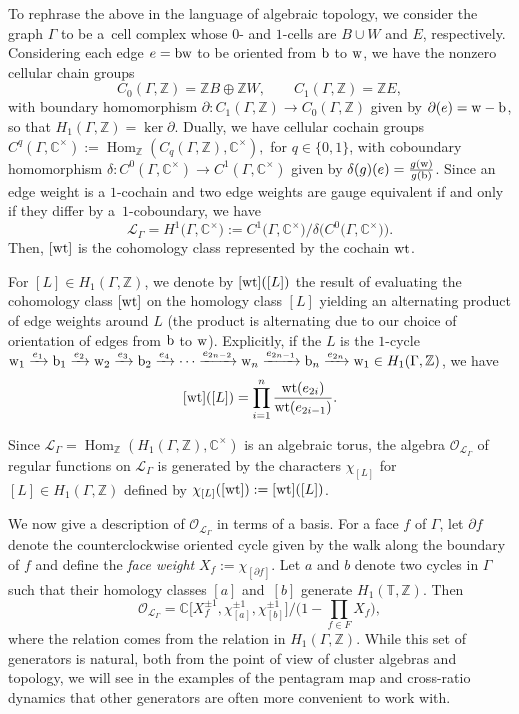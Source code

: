 \documentclass[pdftex]{sigma}
\numberwithin{equation}{section}
\newcommand{\Z}{{\mathbb Z}}
\newcommand{\C}{{\mathbb C}}
\newcommand{\T}{{\mathbb T}}
\newcommand{\ra}{\rightarrow}
\newcommand{\w}{{\rm w}}
\newcommand{\bw}{{\rm b}}
\newcommand{\wt}{{\rm wt}}
\DeclareMathOperator{\Hom}{Hom}
\begin{document}
	To rephrase the above in the language of algebraic topology, we consider the graph $\Gamma$ to be a~cell complex whose $0$- and $1$-cells are $B \cup W$ and $E$, respectively. Considering each edge $e={\rm b w}$ to be oriented from ${\rm b}$ to ${\rm w}$, we have the nonzero cellular chain groups
	\[
	C_0(\Gamma,\Z)=\Z B \oplus \Z W, \qquad C_1(\Gamma,\Z)=\Z E,
	\]
	with boundary homomorphism $\partial\colon C_1(\Gamma,\Z) \ra C_0(\Gamma,\Z)$ given by $\partial(e)={\rm w}-{\rm b}$, so that $H_1(\Gamma,\Z)= \ker \partial$. Dually, we have cellular cochain groups
	$
	C^q(\Gamma,\C^\times):= \Hom _\Z(C_q(\Gamma,\Z),\C^\times),
	$
	for $q \in \{0,1\}$, with coboundary homomorphism $\delta\colon C^0(\Gamma,\C^\times) \ra C^1(\Gamma,\C^\times)$ given by $\delta(g)(e)=\frac{g({\rm w})}{g({\rm b})}$.
	Since an edge weight is a $1$-cochain and two edge weights are gauge equivalent if and only if they differ by a~$1$-coboundary, we have
	\[
		\mathcal L_\Gamma=H^1\big(\Gamma,\C^\times\big):=C^1\big(\Gamma,\C^\times\big)/\delta\bigl(C^0\big(\Gamma,\C^\times\big)\bigr).
	\]
	{Then}, $[{\rm wt}]$ {is} the cohomology class represented by the cochain ${\rm wt}$.
	
	For $[L] \in H_1(\Gamma,\Z)$, we denote by ${[\rm wt]}([L])$ the result of evaluating the cohomology class $[{\rm wt}]$ on the homology class $[L]$ yielding an alternating product of edge weights around $L$ (the product is alternating due to our choice of orientation of edges from $\bw$ to $\w$). Explicitly, if the $L$ is the $1$-cycle ${\rm w}_1 \xrightarrow[]{e_1} {\rm b}_1 \xrightarrow[]{e_2} {\rm w}_2 \xrightarrow[]{e_3} {\rm b}_2 \xrightarrow[]{e_4} \cdots \xrightarrow[]{e_{2n-2}} {\rm w}_n \xrightarrow[]{e_{2n-1}} {\rm b}_n \xrightarrow[]{e_{2n}} {\rm w}_1 \in H_1(\Gamma,\Z)$, we have
	\[
	[{\rm wt}]([L])=\prod_{i=1}^n \frac{\wt(e_{2i})}{\wt(e_{2i-1})}.
	\]
	
	
	Since $\mathcal L_\Gamma=\Hom _\Z(H_1(\Gamma,\Z),\C^\times)$ is an algebraic torus, the algebra $\mathcal O_{\mathcal L_\Gamma}$ of regular functions on $\mathcal L_\Gamma$ is generated by the characters $\chi_{[L]}$ for $[L] \in H_1(\Gamma,\Z)$ defined by $\chi_{[L]}([{\rm wt}]):=[{\rm wt}]([L])$.
	
	We now give a description of $\mathcal O_{\mathcal L_\Gamma}$ in terms of a basis. For a face $f$ of $\Gamma$, let $\partial f$ denote the counterclockwise oriented cycle given by the walk along the boundary of $f$ and {define the \emph{face weight}} $X_f :=\chi_{[\partial f]}$. Let $a$ and $b$ denote two cycles in $\Gamma$ {such that their homology classes $[a]$ and~$[b]$ generate} $H_1(\T,\Z)$. Then
	\[
		\mathcal O_{\mathcal L_\Gamma}=\C\bigl[X_f^{\pm 1},\chi_{[a]}^{\pm 1},\chi_{[b]}^{\pm 1}\bigr]/\big(1-\mbox{$\prod_{f \in F}$} X_f\big),
	\]
	where the relation  comes from the relation  in $H_1(\Gamma,\Z)$. {While this set of generators is natural, both from the point of view of cluster algebras and topology, we will see in the examples of the pentagram map and cross-ratio dynamics that other generators are often more convenient to work with.}
	
\end{document}
